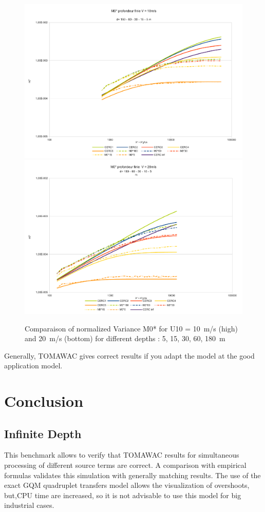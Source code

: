 \documentclass[10pt]{article}
\begin{document}
\begin{figure}
\centering
\includegraphics[scale=0.4]{m0_test7v10.pdf}\\
\includegraphics[scale=0.4]{m0_test7v20.pdf}\\
\caption{Comparaison of normalized Variance M0* for U10 = 10~m/s (high) and
  20~m/s (bottom) for different depths : 5, 15, 30, 60, 180~m}
\end{figure}
Generally, TOMAWAC gives correct results if you adapt the model at the good
application model.
\section{Conclusion}
\subsection*{Infinite Depth}
This benchmark allows to verify that TOMAWAC results for simultaneous
processing of different source terms are correct. A comparison with empirical
formulas validates this simulation with generally matching results. The use of
the exact GQM quadruplet transfers model allows the visualization of
overshoots, but,CPU time are increased, so it is not advisable to use this
model for big industrial cases.
\end{document}
